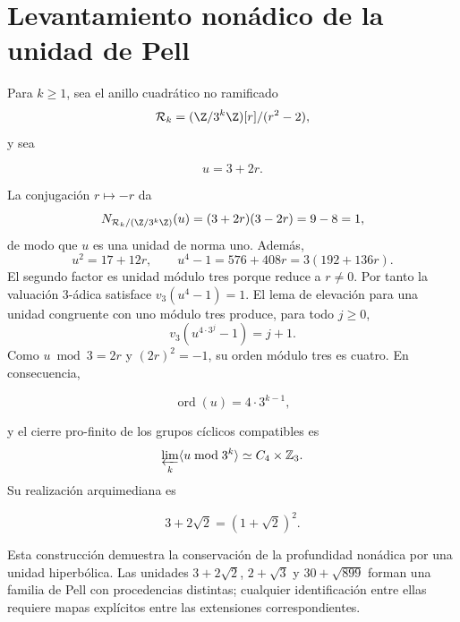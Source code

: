\section{Levantamiento non\'adico de la unidad de Pell}

Para \(k\ge1\), sea el anillo cuadr\'atico no ramificado
\begin{equation}
\mathcal R_k=(\Z/3^k\Z)[r]/(r^2-2),
\label{eq:pell-ring}
\end{equation}
y sea

\[
u=3+2r.
\]

La conjugaci\'on \(r\mapsto-r\) da
\[
N_{\mathcal R_k/(\Z/3^k\Z)}(u)
=(3+2r)(3-2r)=9-8=1,
\]
de modo que \(u\) es una unidad de norma uno. Adem\'as,
\[
u^2=17+12r,\qquad
u^4-1=576+408r=3(192+136r).
\]
El segundo factor es unidad m\'odulo tres porque reduce a \(r\ne0\). Por
tanto la valuaci\'on \(3\)-\'adica satisface
\(v_3(u^4-1)=1\). El lema de elevaci\'on para una unidad congruente con uno
m\'odulo tres produce, para todo \(j\ge0\),
\[
v_3\!\left(u^{4\cdot3^j}-1\right)=j+1.
\]
Como \(u\bmod3=2r\) y \((2r)^2=-1\), su orden m\'odulo tres es cuatro.
En consecuencia,

\begin{equation}
\operatorname{ord}(u)=4\cdot3^{k-1},
\label{eq:pell-order}
\end{equation}

y el cierre pro-finito de los grupos c\'iclicos compatibles es
\begin{equation}
\varprojlim_k\langle u\bmod3^k\rangle
\simeq C_4\times\mathbb Z_3.
\label{eq:pell-profinite}
\end{equation}
Su realizaci\'on arquimediana es

\[
3+2\sqrt2=(1+\sqrt2)^2.
\]

Esta construcci\'on demuestra la conservaci\'on de la profundidad non\'adica
por una unidad hiperb\'olica. Las unidades \(3+2\sqrt2\),
\(2+\sqrt3\) y \(30+\sqrt{899}\) forman una familia de Pell con
procedencias distintas; cualquier identificaci\'on entre ellas requiere
mapas expl\'icitos entre las extensiones correspondientes.

